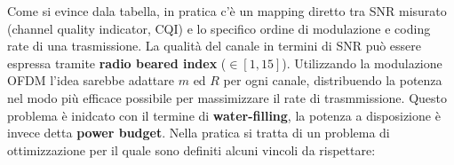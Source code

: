 \begin{table}[H]
\end{table}

Come si evince dala tabella, in pratica c'è un mapping diretto tra SNR misurato (channel quality indicator, CQI) e lo specifico ordine di modulazione e coding rate di una trasmissione.
La qualità del canale in termini di SNR può essere espressa tramite \textbf{radio beared index} ($\in [1, 15]$).
Utilizzando la modulazione OFDM l'idea sarebbe adattare $m$ ed $R$ per ogni canale, distribuendo la potenza nel modo più efficace possibile per massimizzare il rate di trasmmissione. Questo problema è inidcato con il termine di \textbf{water-filling}, la potenza a disposizione è invece detta \textbf{power budget}. Nella pratica si tratta di un problema di ottimizzazione per il quale sono definiti alcuni vincoli da rispettare:

